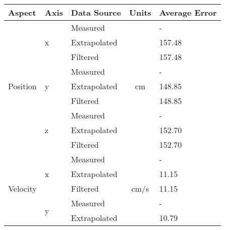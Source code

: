 \begin{table}[ht]
\centering
\begin{tabular}{@{}cllcl@{}}
\toprule
\multicolumn{1}{l}{Aspect}                    & Axis                   & Data Source  & \multicolumn{1}{l}{Units} & Average Error \\ \midrule
\multicolumn{1}{l}{\multirow{9}{*}{Position}} & \multirow{3}{*}{x}     & Measured     & \multirow{9}{*}{cm}       & -          \\
\multicolumn{1}{l}{}                          &                        & Extrapolated &                           & 157.48          \\
\multicolumn{1}{l}{}                          &                        & Filtered     &                           & 157.48          \\
\multicolumn{1}{l}{}                          & \multirow{3}{*}{y}     & Measured     &                           & -          \\
\multicolumn{1}{l}{}                          &                        & Extrapolated &                           & 148.85          \\
\multicolumn{1}{l}{}                          &                        & Filtered     &                           & 148.85          \\
\multicolumn{1}{l}{}                          & \multirow{3}{*}{z}     & Measured     &                           & -         \\
\multicolumn{1}{l}{}                          &                        & Extrapolated &                           & 152.70          \\
\multicolumn{1}{l}{}                          &                        & Filtered     &                           & 152.70          \\ \midrule
\multirow{9}{*}{Velocity}                     & \multirow{3}{*}{x}     & Measured     & \multirow{9}{*}{cm/s}     & -        \\
                                              &                        & Extrapolated &                           & 11.15          \\
                                              &                        & Filtered     &                           & 11.15          \\
                                              & \multirow{3}{*}{y}     & Measured     &                           & -        \\
                                              &                        & Extrapolated &                           & 10.79          \\

\end{tabular}
\end{table}

